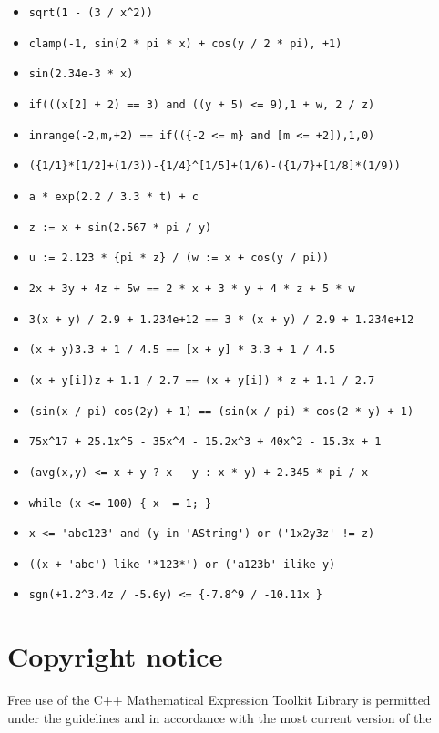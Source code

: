 \begin{itemize}
  \item \verb'sqrt(1 - (3 / x^2))'
  \item \verb'clamp(-1, sin(2 * pi * x) + cos(y / 2 * pi), +1)'
  \item \verb'sin(2.34e-3 * x)'
  \item \verb'if(((x[2] + 2) == 3) and ((y + 5) <= 9),1 + w, 2 / z)'
  \item \verb'inrange(-2,m,+2) == if(({-2 <= m} and [m <= +2]),1,0)'
  \item \verb'({1/1}*[1/2]+(1/3))-{1/4}^[1/5]+(1/6)-({1/7}+[1/8]*(1/9))'
  \item \verb'a * exp(2.2 / 3.3 * t) + c'
  \item \verb'z := x + sin(2.567 * pi / y)'
  \item \verb'u := 2.123 * {pi * z} / (w := x + cos(y / pi))'
  \item \verb'2x + 3y + 4z + 5w == 2 * x + 3 * y + 4 * z + 5 * w'
  \item \verb'3(x + y) / 2.9 + 1.234e+12 == 3 * (x + y) / 2.9 + 1.234e+12'
  \item \verb'(x + y)3.3 + 1 / 4.5 == [x + y] * 3.3 + 1 / 4.5'
  \item \verb'(x + y[i])z + 1.1 / 2.7 == (x + y[i]) * z + 1.1 / 2.7'
  \item \verb'(sin(x / pi) cos(2y) + 1) == (sin(x / pi) * cos(2 * y) + 1)'
  \item \verb'75x^17 + 25.1x^5 - 35x^4 - 15.2x^3 + 40x^2 - 15.3x + 1'
  \item \verb'(avg(x,y) <= x + y ? x - y : x * y) + 2.345 * pi / x'
  \item \verb'while (x <= 100) { x -= 1; }'
  \item \verb"x <= 'abc123' and (y in 'AString') or ('1x2y3z' != z)"
  \item \verb"((x + 'abc') like '*123*') or ('a123b' ilike y)"
  \item \verb'sgn(+1.2^3.4z / -5.6y) <= {-7.8^9 / -10.11x }'
\end{itemize}

\section{Copyright notice}
Free  use  of  the  C++  Mathematical  Expression  Toolkit  Library is
permitted under the guidelines and in accordance with the most current
version of the 


